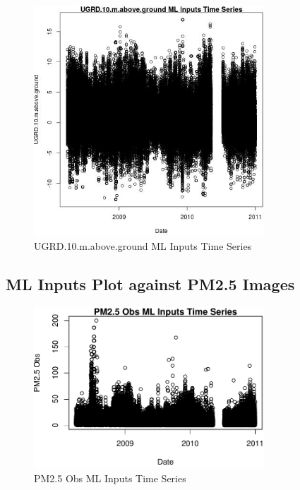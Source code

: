 \begin{figure} 
\centering  
\includegraphics[width=0.77\textwidth]{Code_Outputs/ML_input_report_ML_input_PM25_Step5_part_d_de_duplicated_aves_ML_inputpdfs_UGRD10mabovegroundvDate.jpg} 
\caption{\label{fig:ML_input_report_ML_input_PM25_Step5_part_d_de_duplicated_aves_ML_inputpdfsUGRD10mabovegroundvDate}UGRD.10.m.above.ground ML Inputs Time Series} 
\end{figure} 
 

\subsection{ML Inputs Plot against PM2.5 Images} 
 

\begin{figure} 
\centering  
\includegraphics[width=0.77\textwidth]{Code_Outputs/ML_input_report_ML_input_PM25_Step5_part_d_de_duplicated_aves_ML_inputpdfs_PM25_ObsvDate.pdf} 
\caption{\label{fig:ML_input_report_ML_input_PM25_Step5_part_d_de_duplicated_aves_ML_inputpdfsPM25_ObsvDate}PM2.5 Obs ML Inputs Time Series} 
\end{figure} 
 

